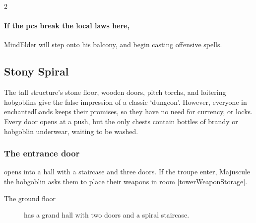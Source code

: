 \begin{multicols}{2}

\paragraph{If the \glspl{pc} break the local laws here,}
\gls{MindElder} will step onto his balcony, and begin casting offensive spells.

\subsection{Stony Spiral}

The tall structure's stone floor, wooden doors, pitch \glspl{torch}, and loitering hobgoblins give the false impression of a classic `dungeon'.
However, everyone in \gls{enchantedLands} keeps their promises, so they have no need for currency, or locks.
Every door opens at a push, but the only chests contain bottles of brandy or hobgoblin underwear, waiting to be washed.

\subsubsection{The entrance door}
opens into a hall with a staircase and three doors.
If the troupe enter, Majuscule the hobgoblin asks them to place their weapons in room \vref{towerWeaponStorage}.

\begin{description}
  \item[The ground floor]
  has a grand hall with two doors and a spiral staircase.


\end{description}
\end{multicols}
